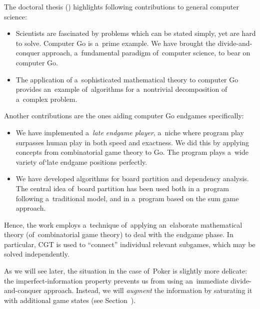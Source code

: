 The doctoral thesis (\cite{Muller1995computer}) highlights following contributions to general computer science:
\begin{itemize}
  \item Scientists are fascinated by problems which can be stated simply, yet are hard to solve.
    Computer Go is a~prime example.
    We have brought the divide-and-conquer approach, a~fundamental paradigm of~computer science, to bear on computer Go.

  \item The application of a~sophisticated mathematical theory to computer Go provides an~example of~algorithms for a~nontrivial decomposition of a~complex problem.
\end{itemize}
Another contributions are the ones aiding computer Go endgames specifically:
\begin{itemize}
  \item We have implemented a~\emph{late endgame player}, a~niche where program play surpasses human play in both speed and exactness.
    We did this by applying concepts from combinatorial game theory to Go.
    The program plays a~wide variety of`late endgame positions perfectly.

  \item We have developed algorithms for board partition and dependency analysis.
    The central idea of~board partition has been used both in a~program following a~traditional model, and in a~program based on the sum game approach.
\end{itemize}
Hence, the work employs a~technique of~applying an~elaborate mathematical theory (of~combinatorial game theory) to deal with the endgame phase.
In particular, CGT is used to ``connect'' individual relevant subgames, which may be solved independently.

As we will see later, the situation in the case of~Poker is slightly more delicate:
the imperfect-information property prevents us from using an~immediate divide-and-conquer approach.
Instead, we will \emph{augment} the information by saturating it with additional game states (see Section~\todo).


